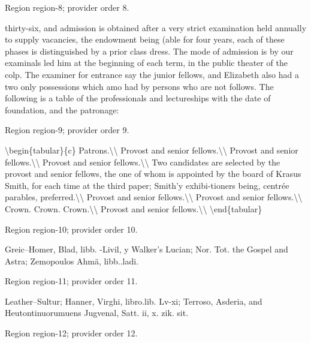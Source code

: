 \documentclass[11pt]{article}
\begin{document}
{\scriptsize\color{gray} Region region-8; provider order 8.\par}
\medskip

thirty-six, and admission is obtained after a very strict examination held annually to supply vacancies, the endowment being (able for four years, each of these phases is distinguished by a prior class dress. The mode of admission is by our examinals led him at the beginning of each term, in the public theater of the colp. The examiner for entrance say the junior fellows, and Elizabeth also had a two only possessions which amo had by persons who are not follows. The following is a table of the professionals and lectureships with the date of foundation, and the patronage:
\par

{\scriptsize\color{gray} Region region-9; provider order 9.\par}
\medskip

\textbackslash{}begin\{tabular\}\{c\}
Patrons.\textbackslash{}\textbackslash{}
Provost and senior fellows.\textbackslash{}\textbackslash{}
Provost and senior fellows.\textbackslash{}\textbackslash{}
Provost and senior fellows.\textbackslash{}\textbackslash{}
Two candidates are selected by the provost and senior fellows, the one of whom is appointed by the board of Krasus Smith, for each time at the third paper; Smith’y exhibi-tioners being, centrée parables, preferred.\textbackslash{}\textbackslash{}
Provost and senior fellows.\textbackslash{}\textbackslash{}
Provost and senior fellows.\textbackslash{}\textbackslash{}
Crown. Crown. Crown.\textbackslash{}\textbackslash{}
Provost and senior fellows.\textbackslash{}\textbackslash{}
\textbackslash{}end\{tabular\}
\par

{\scriptsize\color{gray} Region region-10; provider order 10.\par}
\medskip

Greic--Homer, Blad, libb. -Livil, y Walker’s Lucian; Nor. Tot. the Gospel and Astra; Zemopoulos Ahmä, libb..ladi.
\par

{\scriptsize\color{gray} Region region-11; provider order 11.\par}
\medskip

Leather--Sultur; Hanner, Virghi, libro.lib. Lv-xi; Terroso, Asderia, and Heutontinuorumuens Jugvenal, Satt. ii, x. zik. sit.
\par

{\scriptsize\color{gray} Region region-12; provider order 12.\par}
\medskip
\end{document}
